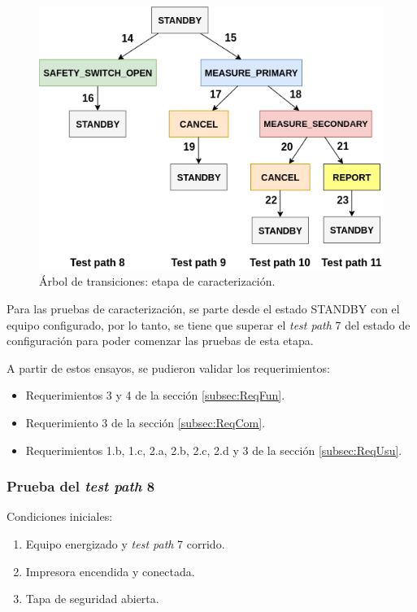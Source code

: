 \begin{figure}[htpb]
	\centering
	\includegraphics[scale=0.95]{./Figures/ArTrans_3.png}
	\caption{Árbol de transiciones: etapa de caracterización.}
	\label{fig:ArTrans_3}
\end{figure}

Para las pruebas de caracterización, se parte desde el estado STANDBY con el equipo configurado, por lo tanto, se tiene que superar el \textit{test path} 7 del estado de configuración para poder comenzar las pruebas de esta etapa.

A partir de estos ensayos, se pudieron validar los requerimientos: 
\begin{itemize}
\item Requerimientos 3 y 4 de la sección \ref{subsec:ReqFun}.
\item Requerimiento 3 de la sección \ref{subsec:ReqCom}.
\item Requerimientos 1.b, 1.c, 2.a, 2.b, 2.c, 2.d y 3 de la sección \ref{subsec:ReqUsu}.
\end{itemize}


\subsubsection{Prueba del \textit{test path} 8}
\label{subsubsec:pruCarac_8}

Condiciones iniciales: 

\begin{enumerate}
	\item Equipo energizado y \textit{test path} 7 corrido.
	\item Impresora encendida y conectada.
	\item Tapa de seguridad abierta.
\end{enumerate}

